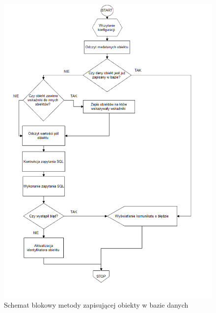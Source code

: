 \documentclass[12pt]{report}
\begin{document}
\newpage
\begin{figure}[H]
\centering
\includegraphics[width=\textwidth]{resources/store_schema.png}
\caption{Schemat blokowy metody zapisującej obiekty w bazie danych}
\label{blok1}
\end{figure}
\end{document}
